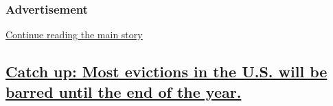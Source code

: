 \hypertarget{advertisement-2}{%
\subsubsection{Advertisement}\label{advertisement-2}}

\protect\hyperlink{after-dfp-ad-mid1}{Continue reading the main story}

\hypertarget{catch-up-most-evictions-in-the-us-will-be-barred-until-the-end-of-the-year}{%
\subsection{\texorpdfstring{\protect\hyperlink{catch-up-most-evictions-in-the-us-will-be-barred-until-the-end-of-the-year}{Catch
up: Most evictions in the U.S. will be barred until the end of the
year.}}{Catch up: Most evictions in the U.S. will be barred until the end of the year.}}\label{catch-up-most-evictions-in-the-us-will-be-barred-until-the-end-of-the-year}}

